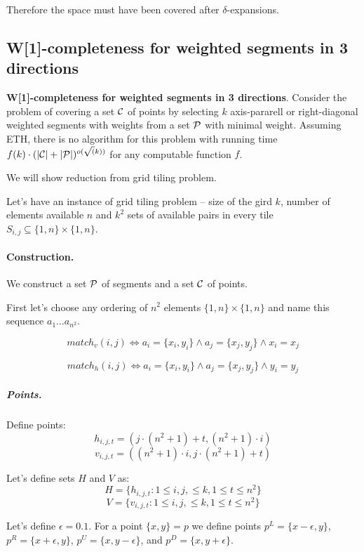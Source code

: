 	Therefore the space must have been covered after $\delta$-expansions.

\subsection{W[1]-completeness for weighted segments in 3 directions}

\begin{tw}
	\textbf{W[1]-completeness for weighted segments in 3 directions}.
	Consider the problem of covering a set $\mathcal{C}$ of points
	by selecting $k$ axis-pararell or right-diagonal weighted segments
	with weights
	from a set $\mathcal{P}$ with minimal weight.
	Assuming ETH, there is no algorithm for this
	problem with running time
	$f(k)\cdot(|\mathcal{C}| + |\mathcal{P}|)^{o(\sqrt(k))}$
	for any computable function $f$.
\end{tw}

We will show reduction from grid tiling problem.


Let's have an instance of grid tiling problem -- size of the
gird $k$, number of elements available $n$
and $k^2$ sets of available pairs in every tile
$S_{i, j} \subseteq \{1,n\} \times \{1,n\}$.

\paragraph{Construction.}
We construct a set $\mathcal{P}$ of segments and a set $\mathcal{C}$
of points.

First let's choose any ordering of $n^2$ elements
$\{1,n\} \times \{1,n\}$ and name this sequence $a_1 \ldots a_{n^2}$.

$$match_v(i, j) \iff
a_i = \{x_i, y_i\} \land a_j = \{x_j, y_j\} \land x_i = x_j$$

$$match_h(i, j) \iff
a_i = \{x_i, y_i\} \land a_j = \{x_j, y_j\} \land y_i = y_j$$


\subparagraph{Points.}

Define points:
	$$h_{i, j, t} = (j \cdot (n^2+1) + t, (n^2+1) \cdot i)$$
	$$v_{i, j, t} = ((n^2+1) \cdot i, j \cdot (n^2+1) + t)$$
	
Let's define sets $H$ and $V$ as:
$$H = \{h_{i, j, t} : 1 \le i, j, \le k, 1 \le t \le n^2\}$$
$$V = \{v_{i, j, t} : 1 \le i, j, \le k, 1 \le t \le n^2\}$$
	
Let's define $\epsilon = 0.1$.
For a point $\{x, y\} = p$ we define points
$p^{L} = \{x - \epsilon, y\}$,
$p^{R} = \{x + \epsilon, y\}$,
$p^{U} = \{x, y - \epsilon\}$,
and $p^{D} = \{x, y + \epsilon\}$.


